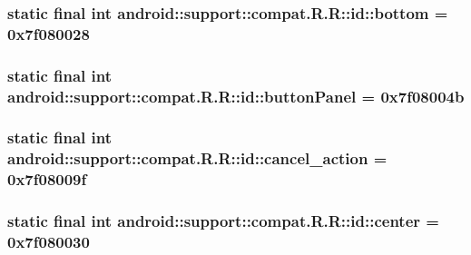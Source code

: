 \hypertarget{classandroid_1_1support_1_1compat_1_1_r_1_1id_49f095ea363ed53f344faa26f4fa6066}{
\subsubsection[{bottom}]{\setlength{\rightskip}{0pt plus 5cm}static final int android::support::compat.R.R::id::bottom = 0x7f080028}}
\label{classandroid_1_1support_1_1compat_1_1_r_1_1id_49f095ea363ed53f344faa26f4fa6066}


\hypertarget{classandroid_1_1support_1_1compat_1_1_r_1_1id_533e8b1bb3c804df5df5fa7cab3094e2}{
\subsubsection[{buttonPanel}]{\setlength{\rightskip}{0pt plus 5cm}static final int android::support::compat.R.R::id::buttonPanel = 0x7f08004b}}
\label{classandroid_1_1support_1_1compat_1_1_r_1_1id_533e8b1bb3c804df5df5fa7cab3094e2}


\hypertarget{classandroid_1_1support_1_1compat_1_1_r_1_1id_3f0f475a17687759e5b9620fb60b3ec3}{
\subsubsection[{cancel\_\-action}]{\setlength{\rightskip}{0pt plus 5cm}static final int android::support::compat.R.R::id::cancel\_\-action = 0x7f08009f}}
\label{classandroid_1_1support_1_1compat_1_1_r_1_1id_3f0f475a17687759e5b9620fb60b3ec3}


\hypertarget{classandroid_1_1support_1_1compat_1_1_r_1_1id_240d1d0c6d7a0199d5a27580fdc16eab}{
\subsubsection[{center}]{\setlength{\rightskip}{0pt plus 5cm}static final int android::support::compat.R.R::id::center = 0x7f080030}}
\label{classandroid_1_1support_1_1compat_1_1_r_1_1id_240d1d0c6d7a0199d5a27580fdc16eab}


